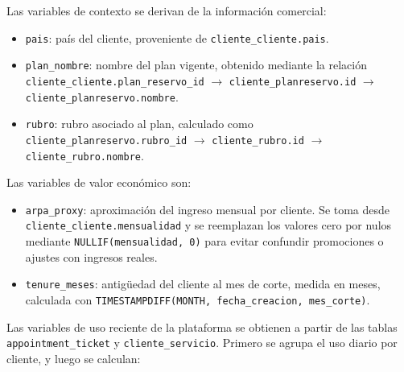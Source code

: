 Las variables de contexto se derivan de la información comercial:

\begin{itemize}
    \item \texttt{pais}: país del cliente, proveniente de \texttt{cliente\_\hspace{0pt}cliente.pais}.
    \item \texttt{plan\_\hspace{0pt}nombre}: nombre del plan vigente, obtenido mediante la relación \texttt{cliente\_\hspace{0pt}cliente.plan\_\hspace{0pt}reservo\_\hspace{0pt}id} $\rightarrow$ \texttt{cliente\_\hspace{0pt}planreservo.id} $\rightarrow$ \texttt{cliente\_\hspace{0pt}planreservo.nombre}.
    \item \texttt{rubro}: rubro asociado al plan, calculado como \texttt{cliente\_\hspace{0pt}planreservo.rubro\_\hspace{0pt}id} $\rightarrow$ \texttt{cliente\_\hspace{0pt}rubro.id} $\rightarrow$ \texttt{cliente\_\hspace{0pt}rubro.nombre}.
\end{itemize}

Las variables de valor económico son:

\begin{itemize}
    \item \texttt{arpa\_\hspace{0pt}proxy}: aproximación del ingreso mensual por cliente. Se toma desde \texttt{cliente\_\hspace{0pt}cliente.mensualidad} y se reemplazan los valores cero por nulos mediante \texttt{NULLIF\hspace{0pt}(mensualidad, 0)} para evitar confundir promociones o ajustes con ingresos reales.
    \item \texttt{tenure\_\hspace{0pt}meses}: antigüedad del cliente al mes de corte, medida en meses, calculada con \texttt{TIMESTAMPDIFF(MONTH, fecha\_\hspace{0pt}creacion, mes\_\hspace{0pt}corte)}.
\end{itemize}

Las variables de uso reciente de la plataforma se obtienen a partir de las tablas \texttt{appointment\_\hspace{0pt}ticket} y \texttt{cliente\_\hspace{0pt}servicio}. Primero se agrupa el uso diario por cliente, y luego se calculan:

